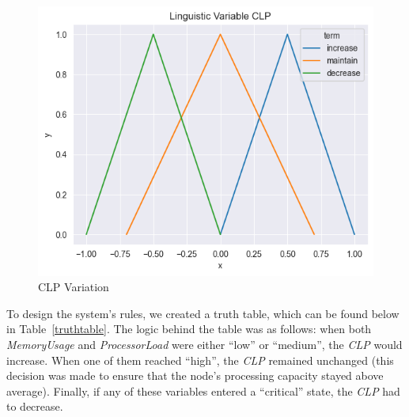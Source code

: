 \documentclass[11pt]{report}
\begin{document}
\begin{figure}[htbp]
\begin{minipage}{0.32\textwidth}
        \label{fig:memory_usage}
    \end{minipage}
    \hfill
    \begin{minipage}{0.32\textwidth}
        \centering
        \includegraphics[width=\textwidth]{../images/triangular_CLP}
        \caption{CLP Variation}
        \label{fig:clp}
    \end{minipage}
\end{figure}


To design the system's rules, we created a truth table, which can be found below in Table~\ref{truthtable}.
The logic behind the table was as follows: when both \textit{MemoryUsage} and \textit{ProcessorLoad} were either ``low'' or ``medium'', the \textit{CLP} would increase.
When one of them reached ``high'', the \textit{CLP} remained unchanged (this decision was made to ensure that the node's processing capacity stayed above average).
Finally, if any of these variables entered a ``critical'' state, the \textit{CLP} had to decrease.
\end{document}
